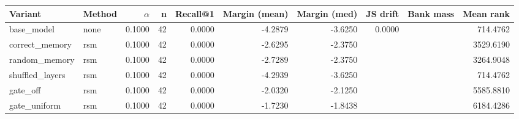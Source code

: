 \begin{tabular}{l l r r r r r r r r}
\toprule
Variant & Method & $\alpha$ & n & Recall@1 & Margin (mean) & Margin (med) & JS drift & Bank mass & Mean rank \\
\midrule
base\_model & none & 0.1000 & 42 & 0.0000 & -4.2879 & -3.6250 & 0.0000 &  & 714.4762 \\
correct\_memory & rsm & 0.1000 & 42 & 0.0000 & -2.6295 & -2.3750 &  &  & 3529.6190 \\
random\_memory & rsm & 0.1000 & 42 & 0.0000 & -2.7289 & -2.3750 &  &  & 3264.9048 \\
shuffled\_layers & rsm & 0.1000 & 42 & 0.0000 & -4.2939 & -3.6250 &  &  & 714.4762 \\
gate\_off & rsm & 0.1000 & 42 & 0.0000 & -2.0320 & -2.1250 &  &  & 5585.8810 \\
gate\_uniform & rsm & 0.1000 & 42 & 0.0000 & -1.7230 & -1.8438 &  &  & 6184.4286 \\
\bottomrule
\end{tabular}
